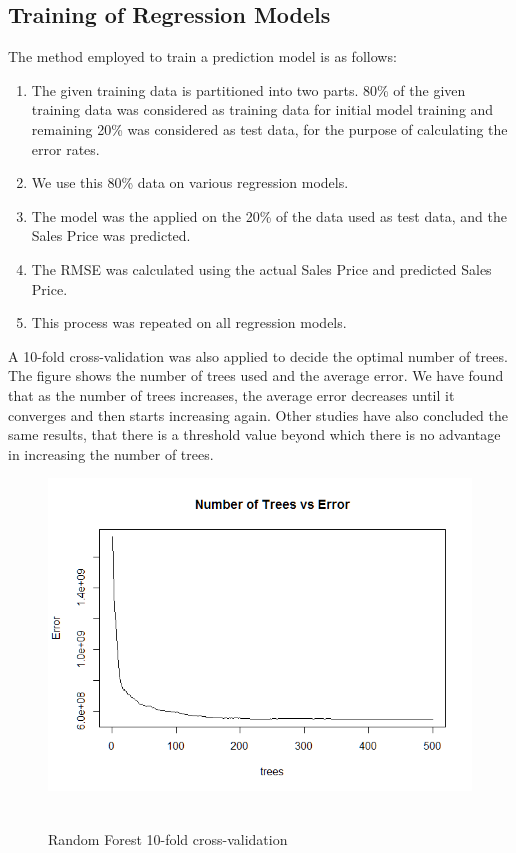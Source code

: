 \documentclass[fleqn,10pt]{SelfArx} %
\begin{document}
\subsection{Training of Regression Models}
The method employed to train a prediction model is as follows:
\begin{enumerate}[noitemsep]
\item The given training data is partitioned into two parts. 80\% of the given training data was considered as training data for initial model training and remaining 20\% was considered as test data, for the purpose of calculating the error rates.
\item We use this 80\% data on various regression models.
\item The model was the applied on the 20\% of the data used as test data, and the Sales Price was predicted.
\item The RMSE was calculated using the actual Sales Price and predicted Sales Price.
\item This process was repeated on all regression models.
\end{enumerate}
A 10-fold cross-validation was also applied to decide the optimal number of trees. The figure shows the number of trees used and the average error. We have found that as the number of trees increases, the average error decreases until it converges and then starts increasing again. Other studies have also concluded the same results, that there is a threshold value beyond which there is no advantage in increasing the number of trees.
\begin{figure}[h]\centering
\includegraphics[scale=0.4]{RandomForest}
\\ \caption{\\ Random Forest 10-fold cross-validation}
\end{figure}
\end{document}
